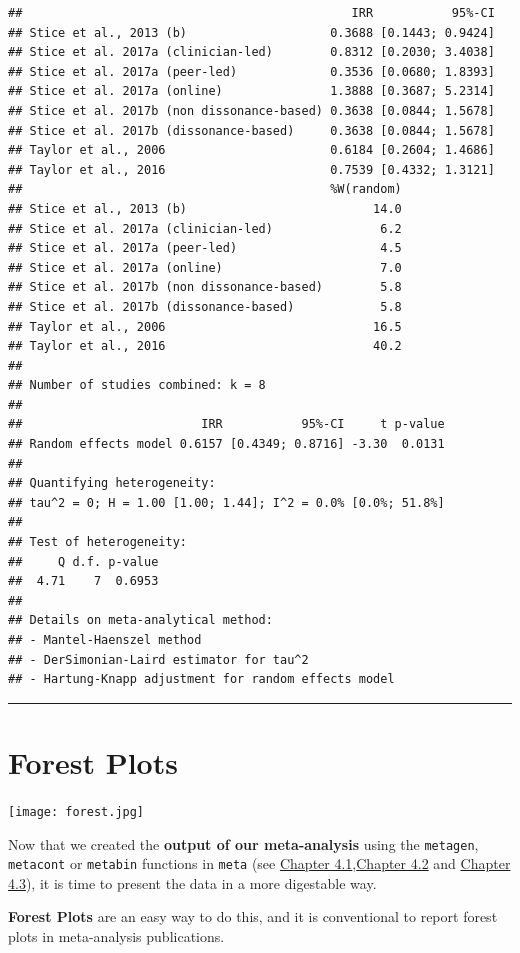 \documentclass[]{book}
\begin{document}
\begin{verbatim}
##                                              IRR           95%-CI
## Stice et al., 2013 (b)                    0.3688 [0.1443; 0.9424]
## Stice et al. 2017a (clinician-led)        0.8312 [0.2030; 3.4038]
## Stice et al. 2017a (peer-led)             0.3536 [0.0680; 1.8393]
## Stice et al. 2017a (online)               1.3888 [0.3687; 5.2314]
## Stice et al. 2017b (non dissonance-based) 0.3638 [0.0844; 1.5678]
## Stice et al. 2017b (dissonance-based)     0.3638 [0.0844; 1.5678]
## Taylor et al., 2006                       0.6184 [0.2604; 1.4686]
## Taylor et al., 2016                       0.7539 [0.4332; 1.3121]
##                                           %W(random)
## Stice et al., 2013 (b)                          14.0
## Stice et al. 2017a (clinician-led)               6.2
## Stice et al. 2017a (peer-led)                    4.5
## Stice et al. 2017a (online)                      7.0
## Stice et al. 2017b (non dissonance-based)        5.8
## Stice et al. 2017b (dissonance-based)            5.8
## Taylor et al., 2006                             16.5
## Taylor et al., 2016                             40.2
## 
## Number of studies combined: k = 8
## 
##                         IRR           95%-CI     t p-value
## Random effects model 0.6157 [0.4349; 0.8716] -3.30  0.0131
## 
## Quantifying heterogeneity:
## tau^2 = 0; H = 1.00 [1.00; 1.44]; I^2 = 0.0% [0.0%; 51.8%]
## 
## Test of heterogeneity:
##     Q d.f. p-value
##  4.71    7  0.6953
## 
## Details on meta-analytical method:
## - Mantel-Haenszel method
## - DerSimonian-Laird estimator for tau^2
## - Hartung-Knapp adjustment for random effects model
\end{verbatim}

\begin{center}\rule{0.5\linewidth}{\linethickness}\end{center}

\hypertarget{forest-plots}{%
\chapter{Forest Plots}\label{forest-plots}}

\texttt{[image: forest.jpg]}

\begin{rmdinfo}
Now that we created the \textbf{output of our meta-analysis} using the
\texttt{metagen}, \texttt{metacont} or \texttt{metabin} functions in
\texttt{meta} (see \protect\hyperlink{fixed}{Chapter
4.1},\protect\hyperlink{random}{Chapter 4.2} and
\protect\hyperlink{binary}{Chapter 4.3}), it is time to present the data
in a more digestable way.

\textbf{Forest Plots} are an easy way to do this, and it is conventional
to report forest plots in meta-analysis publications.
\end{rmdinfo}
\end{document}
